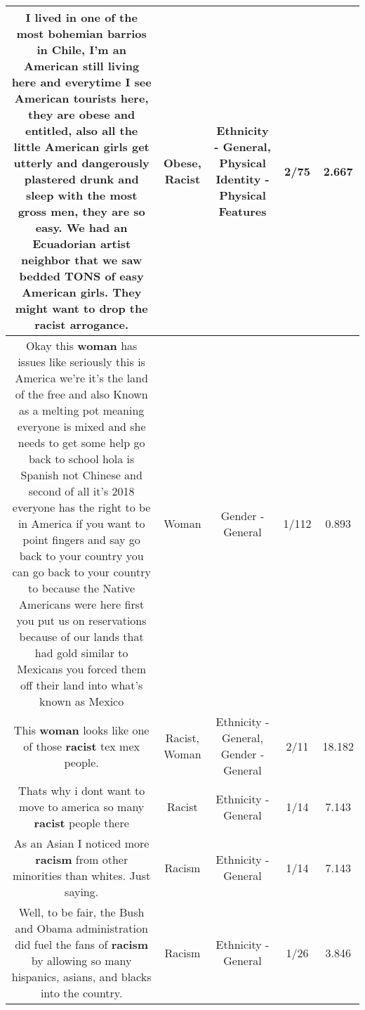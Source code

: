 \documentclass[11pt]{article}
\newlength\mylength
\begin{document}
\begin{center}
\begin{longtable}{|C{.65\mylength}|C{.30\mylength}|C{.12\mylength}|C{.12\mylength}|C{.12\mylength}|}
  \small I lived in one of the most bohemian barrios in Chile, I'm an American still living here and everytime I see American tourists here, they are \textbf{obese} and entitled, also all the little American girls get utterly and dangerously plastered drunk and sleep with the most gross men, they are so easy. We had an Ecuadorian artist neighbor that we saw bedded TONS of easy American girls. They might want to drop the \textbf{racist} arrogance.\normalsize   & Obese, Racist & Ethnicity - General, Physical Identity - Physical Features & 2/75 & 2.667 \\  \hline
  \small Okay this \textbf{woman} has issues like seriously this is America we're it's the land of the free and also Known as a melting pot meaning everyone is mixed and she needs to get some help go back to school hola is Spanish not Chinese and second of all it's 2018 everyone has the right to be in America if you want to point fingers and say go back to your country you can go back to your country to because the Native Americans were here first you put us on reservations because of our lands that had gold similar to Mexicans you forced them off their land into what's known as Mexico\normalsize   & Woman & Gender - General & 1/112 & 0.893 \\  \hline
  \small This \textbf{woman} looks like one of those \textbf{racist} tex mex people.\normalsize   & Racist, Woman & Ethnicity - General, Gender - General & 2/11 & 18.182 \\  \hline
  \small Thats why i dont want to move to america so many \textbf{racist} people there\normalsize   & Racist & Ethnicity - General & 1/14 & 7.143 \\  \hline
  \small As an Asian I noticed more \textbf{racism} from other minorities than whites. Just saying.\normalsize   & Racism & Ethnicity - General & 1/14 & 7.143 \\  \hline
  \small Well, to be fair, the Bush and Obama administration did fuel the fans of \textbf{racism} by allowing so many hispanics, asians, and blacks into the country.\normalsize   & Racism & Ethnicity - General & 1/26 & 3.846 \\  \hline

\end{longtable}
\end{center}
\end{document}
